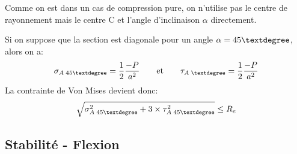 \documentclass[a4paper]{article}
\begin{document}
Comme on est dans un cas de compression pure, on n'utilise pas le centre de rayonnement mais le centre C et l'angle d'inclinaison $ \alpha $ directement.

Si on suppose que la section est diagonale pour un angle $ \alpha = 45\textdegree $, alors on a:
\[ \sigma_{A \; 45 \textdegree} = \frac{1}{2} \frac{-P}{a^2} \qquad \text{et} \qquad \tau_{A \; \textdegree} = \frac{1}{2} \frac{-P}{a^2} \]
La contrainte de Von Mises devient donc:
\[ \sqrt{\sigma_{A \; 45\textdegree}^2 + 3 \times \tau_{A \; 45 \textdegree}^2} \leq R_e \]





\subsection{Stabilité - Flexion}
\end{document}
